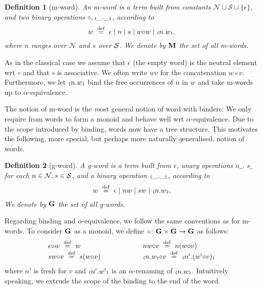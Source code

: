 \documentclass[runningheads,a4paper]{llncs}
\newcommand{\oscope}{\mbox{\tiny$\langle\!\!\langle$}}
\newcommand{\cscope}{\mbox{\tiny$\rangle\!\!\rangle$}}
\newcommand{\mybinder}[2]{\oscope {#1} . {#2} \cscope}
\newcommand{\emptystr}{\epsilon}
\newcommand{\mmdef}{\mbox{$\;\;\stackrel{\mathrm{def}}{=}\;\;$}}
\newcommand{\names}{\mbox{$\mathcal{N}$}}
\newtheorem{definition}{Theorem}[section]
\newtheorem{definition}{Definition}[section]
\begin{document}
\begin{definition}[m-word]
  An \emph{m-word} is a term built from constants
  $\names\cup\mathcal{S}\cup\{\emptystr\}$, and two binary operations
  $\circ,\oscope\_ .\_ \cscope$, according to
$$w \mmdef \emptystr \mid n \mid s \mid w{\circ}w \mid \mybinder{n}{w},$$
where $n$ ranges over $\names$ and $s$ over $\mathcal{S}$. We denote by
$\mathbf{M}$ the set of all m-words.
\end{definition}
As in the classical case we assume that $\emptystr$ (the empty word)
is the neutral element wrt $\circ$ and that $\circ$ is associative. We
often write $wv$ for the concatenation $w\circ v$. Furthermore, we let
$\mybinder{n}{w}$ bind the free occurrences of $n$ in $w$ and take
m-words up to $\alpha$-equivalence.

The notion of m-word is the \emph{m}ost general notion of word with
binders: We only require from words to form a monoid and behave well
wrt $\alpha$-equivalence. Due to the scope introduced by binding,
words now have a tree structure. This motivates the following, more
special, but perhaps more naturally \emph{g}eneralised, notion of
words.
\begin{definition}[g-word]
  A \emph{g-word} is a term built from $\emptystr$, unary operations
  $n\_$, $s\_$ for each $n\in\names,s\in\letters$, and a binary operation
  $\oscope\_ .\_ \cscope$, according to
$$w \mmdef \emptystr \mid nw \mid sw \mid \mybinder{n}{w}.$$
We denote by $\mathbf{G}$ the set of all g-words.
\end{definition}
Regarding binding and $\alpha$-equivalence, we follow the same
conventions as for m-words. To consider $\mathbf{G}$ as a monoid, we
define $\circ\colon \mathbf{G}\times \mathbf{G}\to\mathbf{G}$ as
follows:
\begin{equation}\label{equ:g-concat}
\begin{array}{lcl}
  \emptystr{\circ}w \mmdef w &\quad\quad\quad\quad&
  nw{\circ}v \mmdef n(w{\circ}v)\\
  sw{\circ}v \mmdef s(w{\circ}v) &&
  \mybinder{n}{w}{\circ}v \mmdef \mybinder{n'}{(w'{\circ}v)}
\end{array}
\end{equation}
where $n'$ is fresh for $v$ and $\mybinder{n'}{w'}$ is an
$\alpha$-renaming of $\mybinder{n}{w}$.
Intuitively speaking, we extrude the scope of the binding to the end
of the word.
\end{document}
